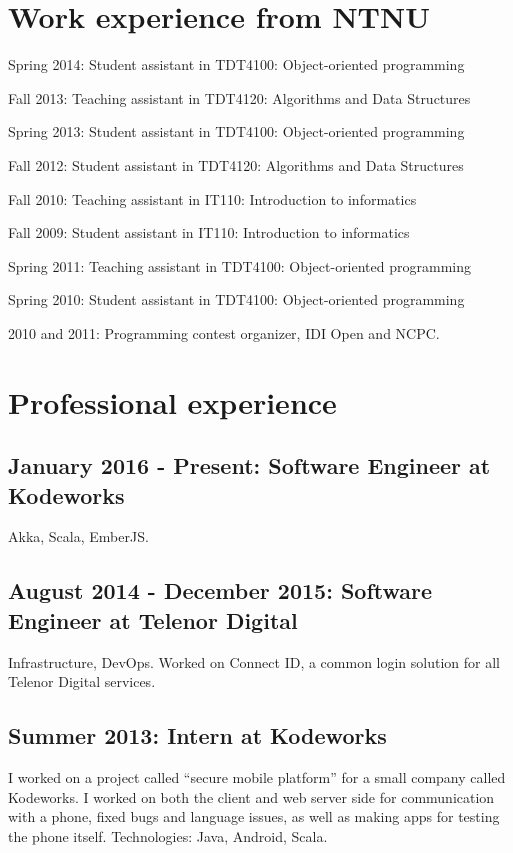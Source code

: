 \documentclass[letterpaper]{article}
\renewenvironment{itemize}{
  \begin{list}{}{
    \setlength{\leftmargin}{1.5em}
  }
}{
  \end{list}
}
\begin{document}
\section*{Work experience from NTNU}
\begin{itemize}
\item Spring 2014: Student assistant in TDT4100: Object-oriented programming
\item Fall 2013: Teaching assistant in TDT4120: Algorithms and Data
  Structures
\item Spring 2013: Student assistant in TDT4100: Object-oriented programming
\item Fall 2012: Student assistant in TDT4120: Algorithms and Data Structures

\item Fall 2010: Teaching assistant in IT110: Introduction to informatics
\item Fall 2009: Student assistant in  IT110: Introduction to informatics

\item Spring 2011: Teaching assistant in  TDT4100: Object-oriented programming
\item Spring 2010: Student assistant in  TDT4100: Object-oriented programming

\item 2010 and 2011: Programming contest organizer, IDI Open and NCPC.
\end{itemize}

\section*{Professional experience}
\subsection*{January 2016 - Present: Software Engineer at Kodeworks}
Akka, Scala, EmberJS.

\subsection*{August 2014 - December 2015: Software Engineer at Telenor Digital}
Infrastructure, DevOps. Worked on Connect ID, a common login solution for all Telenor Digital services.

\subsection*{Summer 2013: Intern at Kodeworks}
I worked on a project called ``secure mobile platform'' for a small company
called Kodeworks. I worked on both the client and web
server side for communication with a phone, fixed bugs and language
issues, as well as making apps for testing the phone itself. Technologies: Java, Android, Scala.
\end{document}
